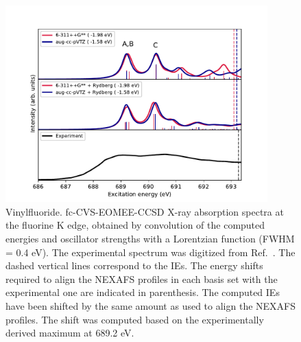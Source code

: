 \documentclass[journal=jctcce,manuscript=article]{achemso}
\begin{document}
\begin{figure}[H]
\includegraphics[width=0.9\textwidth]{Spectra/CH2CHF_F.pdf}  
\caption{Vinylfluoride. fc-CVS-EOMEE-CCSD X-ray absorption spectra at the 
fluorine K edge, obtained by convolution of the computed energies and oscillator strengths with a Lorentzian function (FWHM = 0.4 eV). The experimental spectrum was digitized from Ref.~. 
The dashed vertical lines correspond to the IEs.  
The energy shifts 
required to align the NEXAFS profiles in each basis set with the
experimental one are indicated in parenthesis. The computed IEs have been shifted by the same amount as used to align the NEXAFS profiles. 
The shift was computed based on the experimentally 
derived maximum at 689.2 eV.
\label{fgr:vinylfluoride:F}}
\end{figure}
%
%
\end{document}
